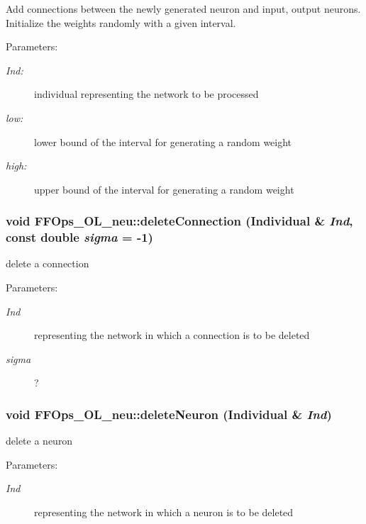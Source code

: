 Add connections between the newly generated neuron and input, output  neurons. Initialize the weights randomly with a given interval. \begin{Desc}
\item[Parameters: ]\par
\begin{description}
\item[{\em 
Ind:}]individual representing the network to be processed \item[{\em 
low:}]lower bound of the interval for generating a random weight \item[{\em 
high:}]upper bound of the interval for generating a random weight \end{description}
\end{Desc}
\subsubsection{\setlength{\rightskip}{0pt plus 5cm}void FFOps\_\-OL\_\-neu::delete\-Connection (Individual \& {\em Ind}, const double {\em sigma} = -1)}\label{classFFOps__OL__neu_a2}


delete a connection

\begin{Desc}
\item[Parameters: ]\par
\begin{description}
\item[{\em 
Ind}]representing the network in which a connection is to be deleted  \item[{\em 
sigma}]? \end{description}
\end{Desc}
\subsubsection{\setlength{\rightskip}{0pt plus 5cm}void FFOps\_\-OL\_\-neu::delete\-Neuron (Individual \& {\em Ind})}\label{classFFOps__OL__neu_a3}


delete a neuron

\begin{Desc}
\item[Parameters: ]\par
\begin{description}
\item[{\em 
Ind}]representing the network in which a neuron is to be deleted \end{description}
\end{Desc}
